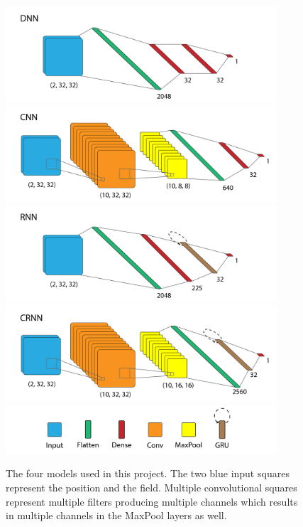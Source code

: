 \documentclass[a4paper]{article}
\begin{document}
\begin{figure}
    \centering
    \includegraphics[width=0.9\textwidth]{Figures/DNN_1.png}
    \includegraphics[width=0.9\textwidth]{Figures/CNN_1.png}
    \includegraphics[width=0.9\textwidth]{Figures/RNN.png}
    \includegraphics[width=0.9\textwidth]{Figures/CRNN_1.png}
    \includegraphics[width=0.9\textwidth]{Figures/model_legend2.png}
    \caption{The four models used in this project. The two blue input squares represent the position and the field. Multiple convolutional squares represent multiple filters producing multiple channels which results in multiple channels in the MaxPool layers as well.}
    \label{fig:model_graph}
\end{figure}
\end{document}
